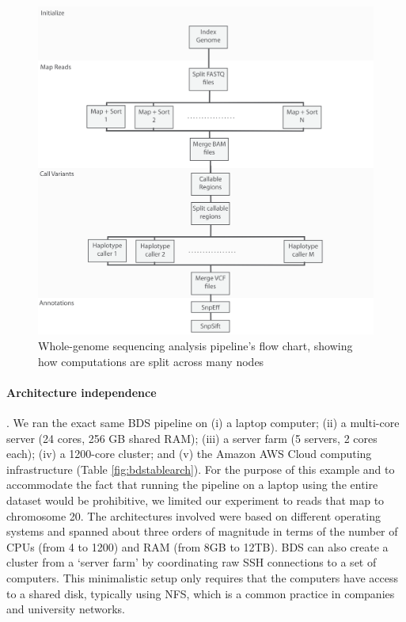 \begin{figure}
    \centering
    \includegraphics[width=12cm]{bds_figure_2_small.png}
    \caption{Whole-genome sequencing analysis pipeline’s flow chart, showing how computations are split across many nodes}
    \label{fig:bdspipeline}
\end{figure}

\paragraph{Architecture independence}. We ran the exact same BDS pipeline on (i) a laptop computer; (ii) a multi-core server (24 cores, 256 GB shared RAM); (iii) a server farm (5 servers, 2 cores each); (iv) a 1200-core cluster; and (v) the Amazon AWS Cloud computing infrastructure (Table \ref{fig:bdstablearch}). For the purpose of this example and to accommodate the fact that running the pipeline on a laptop using the entire dataset would be prohibitive, we limited our experiment to reads that map to chromosome 20. The architectures involved were based on different operating systems and spanned about three orders of magnitude in terms of the number of CPUs (from 4 to 1200) and RAM (from 8GB to 12TB). BDS can also create a cluster from a ‘server farm’ by coordinating raw SSH connections to a set of computers. This minimalistic setup only requires that the computers have access to a shared disk, typically using NFS, which is a common practice in companies and university networks.

